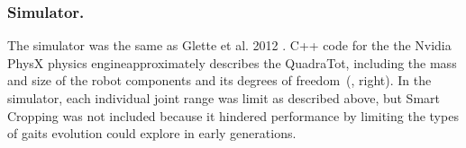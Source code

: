 
\subsubsection{Simulator.}
The simulator was the same as Glette et al. 2012 \cite{glette}. C++ code for the the Nvidia PhysX physics engine\footnotemark[\value{footnote}]
 approximately describes the QuadraTot, including the mass and size of the robot components and its degrees of freedom~(, right). In the simulator, each individual joint range was limit as described above, but Smart Cropping was not included because it hindered performance by limiting the types of gaits evolution could explore in early generations. 


